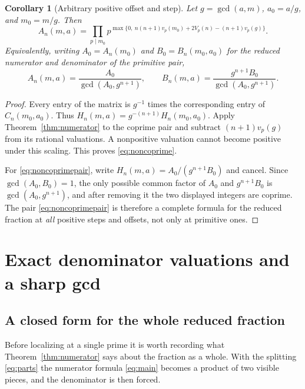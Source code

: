 \documentclass[11pt,a4paper]{article}
\numberwithin{equation}{section}
\newtheorem{corollary}[theorem]{Corollary}
\theoremstyle{definition}
\theoremstyle{remark}
\begin{document}
\begin{corollary}[Arbitrary positive offset and step]\label{cor:noncoprime}
Let $g=\gcd(a,m)$, $a_0=a/g$, and $m_0=m/g$. Then
\begin{equation}\label{eq:noncoprime}
 A_n(m,a)=\prod_{p\mid m_0}
 p^{\max\{0,\ n(n+1)v_p(m_0)+2V_p(n)-(n+1)v_p(g)\}}.
\end{equation}
Equivalently, writing $A_0=A_n(m_0)$ and $B_0=B_n(m_0,a_0)$ for the reduced numerator and denominator of the primitive pair,
\begin{equation}\label{eq:noncoprimepair}
 A_n(m,a)=\frac{A_0}{\gcd(A_0,g^{n+1})},
 \qquad
 B_n(m,a)=\frac{g^{n+1}B_0}{\gcd(A_0,g^{n+1})}.
\end{equation}
\end{corollary}
\begin{proof}
Every entry of the matrix is $g^{-1}$ times the corresponding entry of $C_n(m_0,a_0)$. Thus
$H_n(m,a)=g^{-(n+1)}H_n(m_0,a_0)$. Apply Theorem~\ref{thm:numerator} to the coprime pair and subtract $(n+1)v_p(g)$ from its rational valuations. A nonpositive valuation cannot become positive under this scaling. This proves \eqref{eq:noncoprime}.

For \eqref{eq:noncoprimepair}, write $H_n(m,a)=A_0/(g^{n+1}B_0)$ and cancel. Since $\gcd(A_0,B_0)=1$, the only possible common factor of $A_0$ and $g^{n+1}B_0$ is $\gcd(A_0,g^{n+1})$, and after removing it the two displayed integers are coprime. The pair \eqref{eq:noncoprimepair} is therefore a complete formula for the reduced fraction at \emph{all} positive steps and offsets, not only at primitive ones.
\end{proof}

\section{Exact denominator valuations and a sharp gcd}\label{sec:denominators}

\subsection{A closed form for the whole reduced fraction}
Before localizing at a single prime it is worth recording what Theorem~\ref{thm:numerator} says about the fraction as a whole. With the splitting \eqref{eq:parts} the numerator formula \eqref{eq:main} becomes a product of two visible pieces, and the denominator is then forced.
\end{document}
